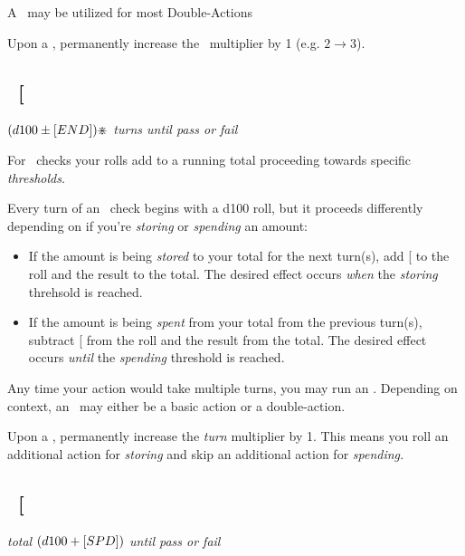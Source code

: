 \noindent A \POWE\  may be utilized for most Double-Actions

\noindent Upon a \BURST, permanently increase the \POWE\ multiplier
by 1 (e.g. $2\rightarrow3$).

\subsection{\ENDUful\  {[}\ENDU\index{Attribute!END}{]}}

\emph{$(d100\pm[END])\divideontimes$ turns until pass or fail}

\noindent For \ENDUful\  checks your rolls add to a running total
proceeding towards specific\textit{ thresholds}.

\noindent Every turn of an \ENDU\  check begins with a d100 roll,
but it proceeds differently depending on if you're \textit{storing}
or \textit{spending} an amount:
\begin{itemize}
\item If the amount is being \emph{stored} to your total for the next turn(s),
add {[}\ENDU{]} to the roll and the result to the total. The desired
effect occurs \emph{when} the \textit{storing} threhsold is reached.
\item If the amount is being \emph{spent} from your total from the previous
turn(s), subtract {[}\ENDU{]} from the roll and the result from the
total. The desired effect occurs \emph{until} the \textit{spending}
threshold is reached.
\end{itemize}
\noindent Any time your action would take multiple turns, you may
run an \ENDU. Depending on context, an \ENDU\  may either be a basic
action or a double-action.

\noindent Upon a \BURST, permanently increase the \emph{turn }multiplier
by 1. This means you roll an additional action for \emph{storing}
and skip an additional action for \emph{spending.}

\noindent {}

\subsection{\SPEDful\  {[}\SPED\index{Attribute!SPD}{]}}

\emph{total $(d100+[SPD])$ until pass or fail}

